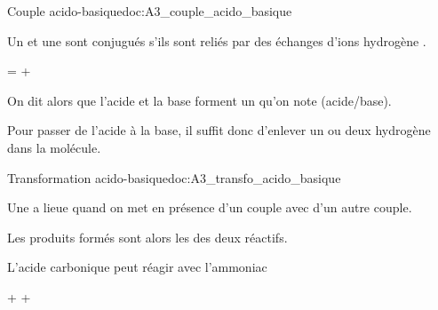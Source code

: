\begin{doc}{Couple acido-basique}{doc:A3_couple_acido_basique}
  \begin{importants}
    Un  et une  sont conjugués s'ils sont reliés par des échanges d'ions hydrogène \ionHydrogene.
    \begin{center}
       =  + \ionHydrogene
    \end{center}
    On dit alors que l'acide et la base forment un  qu'on note  (acide/base).
  \end{importants}

  \attention Pour passer de l'acide à la base, il suffit donc d'enlever un ou deux hydrogène dans la molécule.
\end{doc}


\begin{doc}{Transformation acido-basique}{doc:A3_transfo_acido_basique}
  \begin{importants}
    Une  a lieue quand on met en présence  d'un couple avec  d'un autre couple.

    Les produits formés sont alors les  des deux réactifs.
  \end{importants}

  \exemple L'acide carbonique \acideCarbonique peut réagir avec l'ammoniac \ammoniac
  \begin{center}
    \acideCarbonique + \ammoniac \reaction \bicarbonate + \ammonium
  \end{center}
\end{doc}

